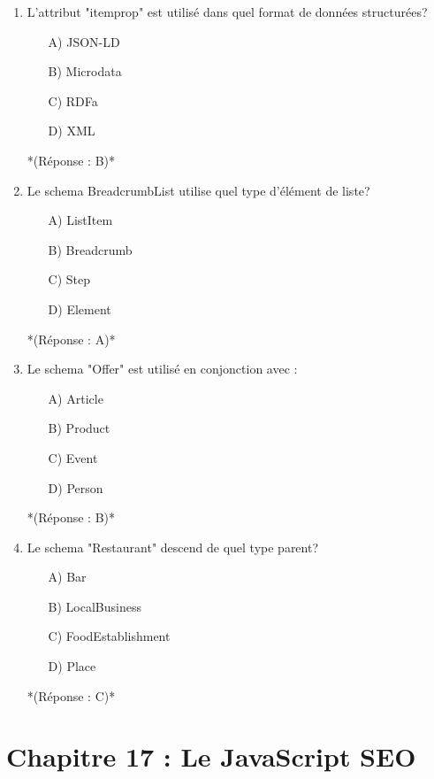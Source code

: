 \documentclass[12pt,a4paper,twoside]{report}
\begin{document}
\begin{enumerate}
\item L'attribut "itemprop" est utilisé dans quel format de données structurées?
\begin{itemize}
\item[A)] JSON-LD
\item[B)] Microdata
\item[C)] RDFa
\item[D)] XML
\end{itemize}
*(Réponse : B)*

\item Le schema BreadcrumbList utilise quel type d'élément de liste?
\begin{itemize}
\item[A)] ListItem
\item[B)] Breadcrumb
\item[C)] Step
\item[D)] Element
\end{itemize}
*(Réponse : A)*

\item Le schema "Offer" est utilisé en conjonction avec :
\begin{itemize}
\item[A)] Article
\item[B)] Product
\item[C)] Event
\item[D)] Person
\end{itemize}
*(Réponse : B)*

\item Le schema "Restaurant" descend de quel type parent?
\begin{itemize}
\item[A)] Bar
\item[B)] LocalBusiness
\item[C)] FoodEstablishment
\item[D)] Place
\end{itemize}
*(Réponse : C)*
\end{enumerate}

\section*{Chapitre 17 : Le JavaScript SEO}
\end{document}
